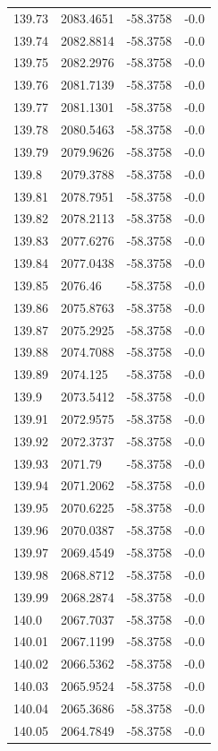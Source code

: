 \begin{table}[H]
\begin{tabular}{llll}
139.73 & 2083.4651 & -58.3758 & -0.0 \\
139.74 & 2082.8814 & -58.3758 & -0.0 \\
139.75 & 2082.2976 & -58.3758 & -0.0 \\
139.76 & 2081.7139 & -58.3758 & -0.0 \\
139.77 & 2081.1301 & -58.3758 & -0.0 \\
139.78 & 2080.5463 & -58.3758 & -0.0 \\
139.79 & 2079.9626 & -58.3758 & -0.0 \\
139.8 & 2079.3788 & -58.3758 & -0.0 \\
139.81 & 2078.7951 & -58.3758 & -0.0 \\
139.82 & 2078.2113 & -58.3758 & -0.0 \\
139.83 & 2077.6276 & -58.3758 & -0.0 \\
139.84 & 2077.0438 & -58.3758 & -0.0 \\
139.85 & 2076.46 & -58.3758 & -0.0 \\
139.86 & 2075.8763 & -58.3758 & -0.0 \\
139.87 & 2075.2925 & -58.3758 & -0.0 \\
139.88 & 2074.7088 & -58.3758 & -0.0 \\
139.89 & 2074.125 & -58.3758 & -0.0 \\
139.9 & 2073.5412 & -58.3758 & -0.0 \\
139.91 & 2072.9575 & -58.3758 & -0.0 \\
139.92 & 2072.3737 & -58.3758 & -0.0 \\
139.93 & 2071.79 & -58.3758 & -0.0 \\
139.94 & 2071.2062 & -58.3758 & -0.0 \\
139.95 & 2070.6225 & -58.3758 & -0.0 \\
139.96 & 2070.0387 & -58.3758 & -0.0 \\
139.97 & 2069.4549 & -58.3758 & -0.0 \\
139.98 & 2068.8712 & -58.3758 & -0.0 \\
139.99 & 2068.2874 & -58.3758 & -0.0 \\
140.0 & 2067.7037 & -58.3758 & -0.0 \\
140.01 & 2067.1199 & -58.3758 & -0.0 \\
140.02 & 2066.5362 & -58.3758 & -0.0 \\
140.03 & 2065.9524 & -58.3758 & -0.0 \\
140.04 & 2065.3686 & -58.3758 & -0.0 \\
140.05 & 2064.7849 & -58.3758 & -0.0 \\

\end{tabular}
\end{table}
